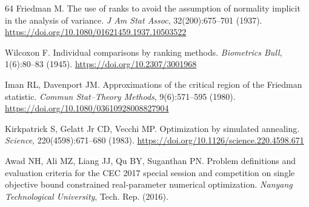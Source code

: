\documentclass[pdflatex,onecolumn,sn-mathphys-num]{sn-jnl}
\begin{document}
\begin{thebibliography}{64}
Friedman M. The use of ranks to avoid the assumption of normality implicit in the analysis of variance. \textit{J Am Stat Assoc}, 32(200):675--701 (1937). \url{https://doi.org/10.1080/01621459.1937.10503522}

Wilcoxon F. Individual comparisons by ranking methods. \textit{Biometrics Bull}, 1(6):80--83 (1945). \url{https://doi.org/10.2307/3001968}

Iman RL, Davenport JM. Approximations of the critical region of the Friedman statistic. \textit{Commun Stat--Theory Methods}, 9(6):571--595 (1980). \url{https://doi.org/10.1080/03610928008827904}


Kirkpatrick S, Gelatt Jr CD, Vecchi MP. Optimization by simulated annealing. \textit{Science}, 220(4598):671--680 (1983). \url{https://doi.org/10.1126/science.220.4598.671}

Awad NH, Ali MZ, Liang JJ, Qu BY, Suganthan PN. Problem definitions and evaluation criteria for the CEC 2017 special session and competition on single objective bound constrained real-parameter numerical optimization. \textit{Nanyang Technological University}, Tech. Rep. (2016).

\end{thebibliography}
\end{document}
